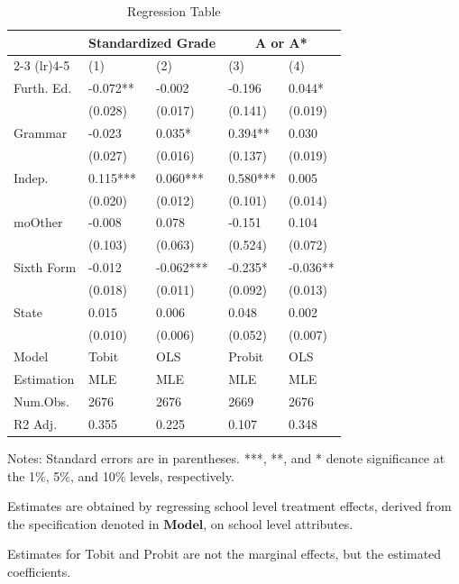 \begin{table}[ht]
\centering
\caption{Regression Table} \label{tab:regression}
\begin{threeparttable}
\begin{tabular}{lllll}
\toprule
\midrule
& \multicolumn{2}{c}{Standardized Grade} & \multicolumn{2}{c}{A or A*} \\
\cmidrule(lr){2-3} \cmidrule(lr){4-5} 
 & (1)       & (2)       & (3)     & (4) \\
\midrule
Furth. Ed. & -0.072** & -0.002   & -0.196   & 0.044*   \\
           & (0.028)   & (0.017)   & (0.141)   & (0.019)   \\
Grammar & -0.023   & 0.035*   & 0.394**  & 0.030    \\
        & (0.027)   & (0.016)   & (0.137)   & (0.019)   \\
Indep.  & 0.115*** & 0.060*** & 0.580*** & 0.005    \\
        & (0.020)   & (0.012)   & (0.101)   & (0.014)   \\
moOther   & -0.008   & 0.078    & -0.151   & 0.104    \\
        & (0.103)   & (0.063)   & (0.524)   & (0.072)   \\
Sixth Form & -0.012   & -0.062*** & -0.235*  & -0.036** \\
           & (0.018)   & (0.011)   & (0.092)   & (0.013)   \\
State   & 0.015    & 0.006    & 0.048    & 0.002    \\
        & (0.010)   & (0.006)   & (0.052)   & (0.007)   \\
\midrule
Model   & Tobit    & OLS      & Probit   & OLS      \\
Estimation & MLE & MLE & MLE & MLE \\
Num.Obs.& 2676     & 2676     & 2669     & 2676    \\
R2 Adj. & 0.355    & 0.225    & 0.107    & 0.348   \\
\bottomrule
\end{tabular}
\begin{tablenotes}
    \footnotesize
    \item[*] Notes: Standard errors are in parentheses. ***, **, and * denote significance at the 1\%, 5\%, and 10\% levels, respectively.
    \item Estimates are obtained  by regressing school level treatment effects, derived from the specification denoted in $\mathbf{Model}$, on school level attributes. 
    \item Estimates for Tobit and Probit are not the marginal effects, but the estimated coefficients.
\end{tablenotes}
\end{threeparttable}
\end{table}
